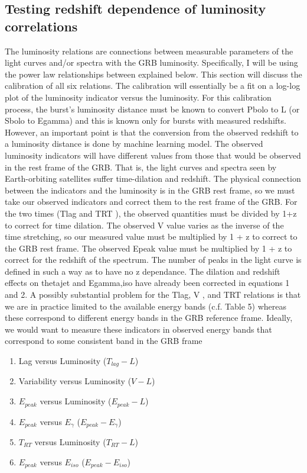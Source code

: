 \subsection{Testing redshift dependence of luminosity correlations}
The luminosity relations are connections between measurable parameters of the light curves and/or spectra with the GRB luminosity. Specifically, I will be using the power law relationships between explained below. This section will discuss the calibration of all six relations. The calibration will essentially be a fit on a log-log plot of the luminosity indicator versus the luminosity. For this calibration process, the burst’s luminosity distance must be known to convert Pbolo to L (or Sbolo to Egamma) and this is known only for bursts with measured redshifts. However, an important point is that the conversion from the observed redshift to a luminosity distance is done by machine learning model. The observed luminosity indicators will have different values from those that would be observed in the rest frame of the GRB. That is, the light curves and spectra seen by Earth-orbiting satellites suffer time-dilation and redshift. The physical connection between the indicators and the luminosity is in the GRB rest frame, so we must take our observed indicators and correct them to the rest frame of the GRB. For the two times (Tlag and TRT ), the observed quantities must be divided by 1+z to correct for time dilation. The observed V value varies as the inverse of the time stretching, so our measured value must be multiplied by 1 + z to correct to the GRB rest frame. The observed Epeak value must be multiplied by 1 + z to correct for the redshift of the spectrum. The number of peaks in the light curve is defined in such a way as to have no z dependance. The dilation and redshift effects on thetajet and Egamma,iso have already been corrected in equations 1 and 2. A possibly substantial problem for the Tlag, V , and TRT relations is that we are in practice limited to the available energy bands (c.f. Table 5) whereas these correspond to different energy bands in the GRB reference frame. Ideally, we would want to measure these indicators in observed energy bands that correspond to some consistent band in the GRB frame
\begin{enumerate}
\item{Lag versus Luminosity ($T_{lag}-L$)}
\item{Variability versus Luminosity ($V-L$)}
\item{$E_{peak}$ versus Luminosity ($E_{peak}-L$)}
\item{$E_{peak}$ versus $E_{\gamma}$ ($E_{peak}-E_{\gamma}$)}
\item{$T_{RT}$ versus Luminosity ($T_{RT}-L$)}
\item{$E_{peak}$ versus $E_{iso}$ ($E_{peak}-E_{iso}$)}
\end{enumerate}

